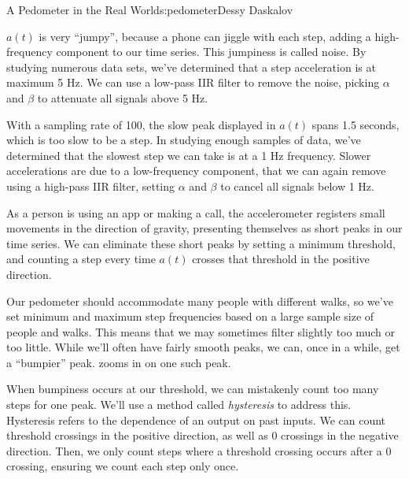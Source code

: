 \begin{aosachapter}{A Pedometer in the Real World}{s:pedometer}{Dessy Daskalov}

\label{jumpy-peaks}

$a(t)$ is very ``jumpy'', because a phone can jiggle with each step,
adding a high-frequency component to our time series. This jumpiness is
called noise. By studying numerous data sets, we've determined that a
step acceleration is at maximum 5 Hz. We can use a low-pass IIR filter
to remove the noise, picking $\alpha$ and $\beta$ to attenuate all
signals above 5 Hz.

\label{slow-peaks}

With a sampling rate of 100, the slow peak displayed in $a(t)$ spans 1.5
seconds, which is too slow to be a step. In studying enough samples of
data, we've determined that the slowest step we can take is at a 1 Hz
frequency. Slower accelerations are due to a low-frequency component,
that we can again remove using a high-pass IIR filter, setting $\alpha$
and $\beta$ to cancel all signals below 1 Hz.

\label{short-peaks}

As a person is using an app or making a call, the accelerometer
registers small movements in the direction of gravity, presenting
themselves as short peaks in our time series. We can eliminate these
short peaks by setting a minimum threshold, and counting a step every
time $a(t)$ crosses that threshold in the positive direction.

\label{bumpy-peaks}

Our pedometer should accommodate many people with different walks, so
we've set minimum and maximum step frequencies based on a large sample
size of people and walks. This means that we may sometimes filter
slightly too much or too little. While we'll often have fairly smooth
peaks, we can, once in a while, get a ``bumpier'' peak.
 zooms in on one such peak.

When bumpiness occurs at our threshold, we can mistakenly count too many
steps for one peak. We'll use a method called \emph{hysteresis} to
address this. Hysteresis refers to the dependence of an output on past
inputs. We can count threshold crossings in the positive direction, as
well as 0 crossings in the negative direction. Then, we only count steps
where a threshold crossing occurs after a 0 crossing, ensuring we count
each step only once.


\end{aosachapter}
